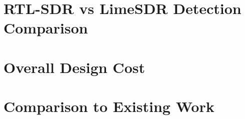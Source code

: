 \section{RTL-SDR vs LimeSDR Detection Comparison \label{sec:SDRcomparison}}

\section{Overall Design Cost}

\section{Comparison to Existing Work}
